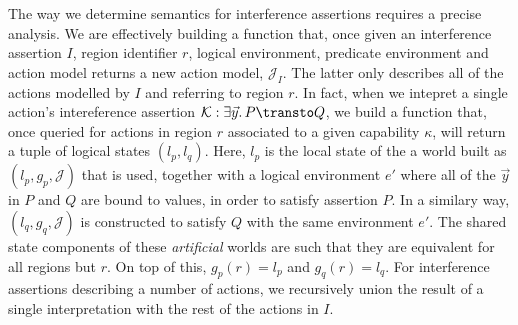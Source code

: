 The way we determine semantics for interference assertions requires a precise analysis. We are effectively building a function that, once given an interference assertion $I$, region identifier $r$, logical environment, predicate environment and action model returns a new action model, $\mathcal{J}_I$. The latter only describes all of the actions modelled by $I$ and referring to region $r$. In fact, when we intepret a single action's intereference assertion $\mathcal{K}: \exists \vec{y} \ldotp P \transto Q$, we build a function that, once queried for actions in region $r$ associated to a given capability $\kappa$, will return a tuple of logical states $(l_p, l_q)$. Here, $l_p$ is the local state of the a world built as $(l_p, g_p, \mathcal{J})$ that is used, together with a logical environment $e'$ where all of the $\vec{y}$ in $P$ and $Q$ are bound to values, in order to satisfy assertion $P$. In a similary way, $(l_q, g_q, \mathcal{J})$ is constructed to satisfy $Q$ with the same environment $e'$. The shared state components of these \textit{artificial} worlds are such that they are equivalent for all regions but $r$. On top of this, $g_p(r) = l_p$ and $g_q(r) = l_q$. For interference assertions describing a number of actions, we recursively union the result of a single interpretation with the rest of the actions in $I$.

